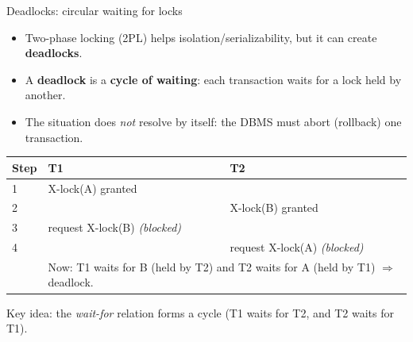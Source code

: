 \documentclass[10pt,aspectratio=169]{beamer}
\begin{document}
\begin{frame}{Deadlocks: circular waiting for locks}
\small
\begin{itemize}
  \item Two-phase locking (2PL) helps isolation/serializability, but it can create \textbf{deadlocks}.
  \item A \textbf{deadlock} is a \textbf{cycle of waiting}: each transaction waits for a lock held by another.
  \item The situation does \emph{not} resolve by itself: the DBMS must abort (rollback) one transaction.
\end{itemize}

\vspace{1mm}
\begin{center}
\begin{tabular}{@{}l p{} p{}@{}}
\toprule
\textbf{Step} & \textbf{T1} & \textbf{T2}\\
\midrule
1 & X-lock(A) granted & \\
2 &  & X-lock(B) granted\\
3 & request X-lock(B) \emph{(blocked)} & \\
4 &  & request X-lock(A) \emph{(blocked)}\\
\midrule
 & \multicolumn{2}{l}{Now: T1 waits for B (held by T2) and T2 waits for A (held by T1) $\Rightarrow$ deadlock.}\\
\bottomrule
\end{tabular}
\end{center}

\footnotesize
Key idea: the \emph{wait-for} relation forms a cycle (T1 waits for T2, and T2 waits for T1).
\end{frame}



\end{document}
